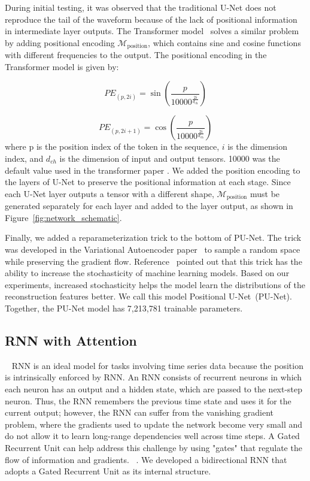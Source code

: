 During initial testing, it was observed that the traditional U-Net does not reproduce the tail of the waveform because of the lack of positional information in intermediate layer outputs. The Transformer model~\cite{Transformer} solves a similar problem by adding positional encoding $\mathcal{M}_{\mathrm{position}}$, which contains sine and cosine functions with different frequencies to the output. The positional encoding in the Transformer model is given by:

\begin{equation}
PE_{(p, 2i)} = \sin\left(\frac{p}{10000^{\frac{2i}{d_{\text{ch}}}}}\right)
\label{eqn:positional_encoding_sin}
\end{equation}

\begin{equation}
PE_{(p, 2i+1)} = \cos\left(\frac{p}{10000^{\frac{2i}{d_{\text{ch}}}}}\right)
\label{eqn:positional_encoding_cos}
\end{equation}
where p is the position index of the token in the sequence, $i$ is the dimension index, and $d_{ch}$ is the dimension of input and output tensors. 10000 was the default value used in the transformer paper \cite{Transformer}. We added the position encoding to the layers of U-Net to preserve the positional information at each stage. Since each U-Net layer outputs a tensor with a different shape, $\mathcal{M}_{\mathrm{position}}$ must be generated separately for each layer and added to the layer output, as shown in Figure~\ref{fig:network_schematic}.

Finally, we added a reparameterization trick to the bottom of PU-Net. The trick was developed in the Variational Autoencoder paper~\cite{VAE} to sample a random space while preserving the gradient flow. Reference~\cite{AAE} pointed out that this trick has the ability to increase the stochasticity of machine learning models. Based on our experiments, increased stochasticity helps the model learn the distributions of the reconstruction features better. We call this model Positional U-Net~(PU-Net). Together, the PU-Net model has 7,213,781 trainable parameters.

\subsection{RNN with Attention}~\label{subapp:RNN}
RNN is an ideal model for tasks involving time series data because the position is intrinsically enforced by RNN. \cite{Rumelhart1986} An RNN consists of recurrent neurons in which each neuron has an output and a hidden state, which are passed to the next-step neuron. Thus, the RNN remembers the previous time state and uses it for the current output; however, the RNN can suffer from the vanishing gradient problem, where the gradients used to update the network become very small and do not allow it to learn long-range dependencies well across time steps. A Gated Recurrent Unit can help address this challenge by using "gates" that regulate the flow of information and gradients. ~\cite{GRU}. We developed a bidirectional RNN that adopts a Gated Recurrent Unit \cite{GRU} as its internal structure.

